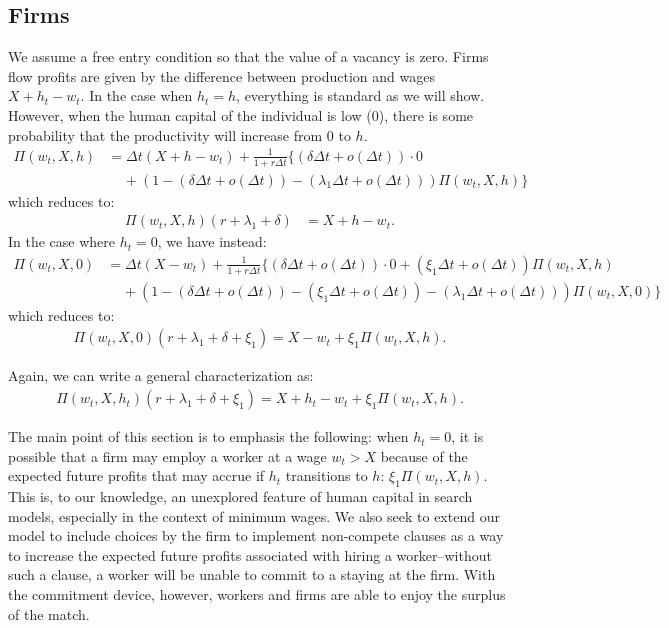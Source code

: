 \documentclass[11pt]{article}
\begin{document}
\subsection[Firms]{Firms}%
\label{sub:firms}
We assume a free entry condition so that the value of a vacancy is zero.
Firms flow profits are given by the difference between production and wages
$X + h_t - w_t$. In the case when $h_t = h$, everything is standard as we
will show. However, when the human capital of the individual is low
($0$), there is some probability that the productivity will increase from
$0$ to $h$.
 \begin{align*}
     \Pi(w_t,X,h) &= \Delta t(X + h - w_t) + \frac{1}{1+r\Delta t} \{ (\delta
     \Delta t + o(\Delta t)) \cdot 0 \\
                  &\;\;\;\;+ (1-(\delta \Delta t + o(\Delta t))-(\lambda_1
                  \Delta t + o(\Delta t))) \Pi(w_t,X,h)\}
\end{align*}
which reduces to:
\begin{align*}
         \Pi(w_t,X,h)(r+\lambda_1+\delta) &= X + h - w_t 
.\end{align*}
In the case where $h_t = 0$, we have instead:
\begin{align*}
    \Pi(w_t,X,0) &= \Delta t(X - w_t) + \frac{1}{1+r\Delta t} \{ (\delta
        \Delta t + o(\Delta t)) \cdot 0 + (\xi_1 \Delta t + o(\Delta
        t))\Pi(w_t,X,h) \\
                 &\;\;\;\; + (1-(\delta \Delta t + o(\Delta t))
     -(\xi_1 \Delta t + o(\Delta t))
     -(\lambda_1 \Delta t + o(\Delta t)))
 \Pi(w_t,X,0)\}
\end{align*}
which reduces to:
\begin{align*}
    \Pi(w_t,X,0)(r+\lambda_1+\delta+\xi_1) = X - w_t + \xi_1 \Pi(w_t,X,h)
.\end{align*}


Again, we can write a general characterization as:
\begin{align*}
    \Pi(w_t,X,h_t)(r+\lambda_1+\delta+\xi_1) = X + h_t - w_t +  \xi_1 \Pi(w_t,X,h)
.\end{align*}


The main point of this section is to emphasis the following: when $h_t =
0$, it is possible that a firm may employ a worker at a wage  $w_t > X$
because of the expected future profits that may accrue if  $h_t$
transitions to $h$: $\xi_1 \Pi(w_t,X,h)$. This is, to our knowledge, an unexplored feature of
human capital in search models, especially in the context of minimum wages.
We also seek to extend our model to include choices by the firm to
implement non-compete clauses as a way to increase the expected future
profits associated with hiring a worker--without such a clause, a worker
will be unable to commit to a staying at the firm. With the commitment
device, however, workers and firms are able to enjoy the surplus of the
match.
\end{document}
